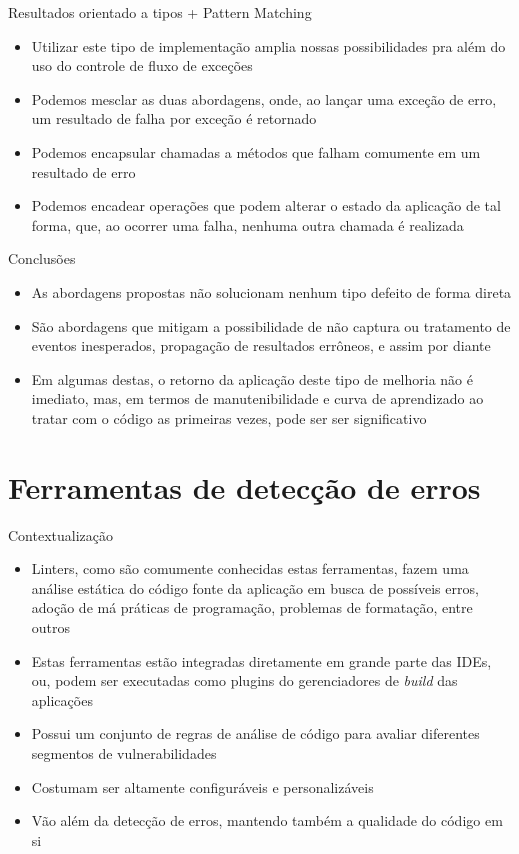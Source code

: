 \documentclass[brazilian]{beamer}
\begin{document}
\begin{frame}{Resultados orientado a tipos + Pattern Matching}
    \begin{itemize}
        \item Utilizar este tipo de implementação amplia nossas possibilidades pra além do uso do controle de fluxo de exceções
        \item Podemos mesclar as duas abordagens, onde, ao lançar uma exceção de erro, um resultado de falha por exceção é retornado
        \item Podemos encapsular chamadas a métodos que falham comumente em um resultado de erro
        \item Podemos encadear operações que podem alterar o estado da aplicação de tal forma, que, ao ocorrer uma falha, nenhuma outra chamada é realizada
    \end{itemize}
\end{frame}

\begin{frame}{Conclusões}
    \begin{itemize}
        \item As abordagens propostas não solucionam nenhum tipo defeito de forma direta
        \item São abordagens que mitigam a possibilidade de não captura ou tratamento de eventos inesperados, propagação de resultados errôneos, e assim por diante
        \item Em algumas destas, o retorno da aplicação deste tipo de melhoria não é imediato, mas, em termos de manutenibilidade e curva de aprendizado ao tratar com o código as primeiras vezes, pode ser ser significativo
    \end{itemize}
\end{frame}

\section{Ferramentas de detecção de erros}

\begin{frame}{Contextualização}
    \begin{itemize}
        \item Linters, como são comumente conhecidas estas ferramentas, fazem uma análise estática do código fonte da aplicação em busca de possíveis erros, adoção de má práticas de programação, problemas de formatação, entre outros
        \item Estas ferramentas estão integradas diretamente em grande parte das IDEs, ou, podem ser executadas como plugins do gerenciadores de \textit{build} das aplicações
        \item Possui um conjunto de regras de análise de código para avaliar diferentes segmentos de vulnerabilidades
        \item Costumam ser altamente configuráveis e personalizáveis
        \item Vão além da detecção de erros, mantendo também a qualidade do código em si
    \end{itemize}
\end{frame}
\end{document}
